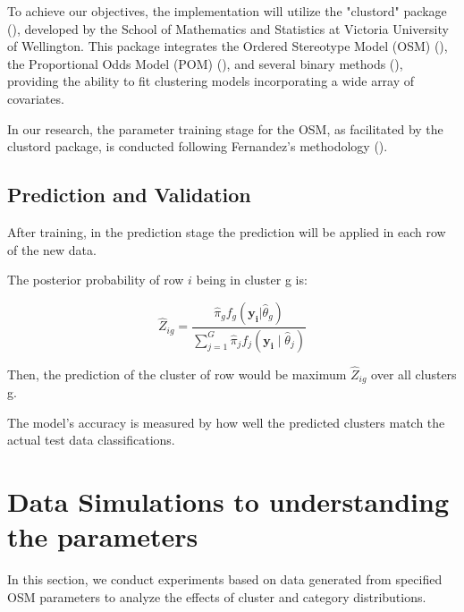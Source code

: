 \documentclass{article}
\begin{document}
To achieve our objectives, the implementation will utilize the "clustord" package (\cite{clustord2024}), 
developed by the School of Mathematics and Statistics at Victoria University of Wellington. 
This package integrates the Ordered Stereotype Model (OSM) (\cite{fernandez2016mixture}), the Proportional Odds Model (POM) (\cite{matechou2016biclustering}), and several binary methods (\cite{pledger2014multivariate}), 
providing the ability to fit clustering models incorporating a wide array of covariates.

In our research, the parameter training stage for the OSM, as facilitated by the clustord package, is conducted following Fernandez's methodology (\cite{fernandez2016mixture}).

\subsection{Prediction and Validation}

After training, in the prediction stage the prediction will be applied in each row of the new data.

The posterior probability of row $i$ being in cluster g is:


\begin{equation}
  \hat{Z}_{ig} = \frac{\hat{\pi}_g f_g(\mathbf{y_i}|\hat{\theta}_g)}{\sum_{j=1}^{G} \hat{\pi}_j f_j(\mathbf{y_i} \mid \hat{\theta}_j)}
\end{equation}

Then, the prediction of the cluster of row would be maximum $\hat{Z}_{ig}$ over all clusters g.

The model's accuracy is measured by how well the predicted clusters match the actual test data classifications.

\section{Data Simulations to understanding the parameters}

In this section, we conduct experiments based on data generated from specified OSM parameters to analyze the effects of cluster and category distributions.
\end{document}
